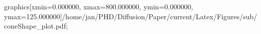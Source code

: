 graphics[xmin=0.000000, xmax=800.000000, ymin=0.000000, ymax=125.000000]{/home/jan/PHD/Diffusion/Paper/current/Latex/Figures/sub/coneShape_plot.pdf}; 
